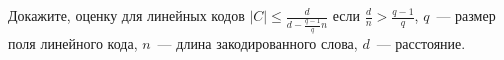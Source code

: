 Докажите, оценку для линейных кодов $|C| \leq \frac{d}{d - \frac{q - 1}{q} n}$ если
$\frac{d}{n} > \frac{q - 1}{q}$, $q$~--- размер поля линейного кода, $n$~--- длина закодированного слова,
$d$~--- расстояние.
